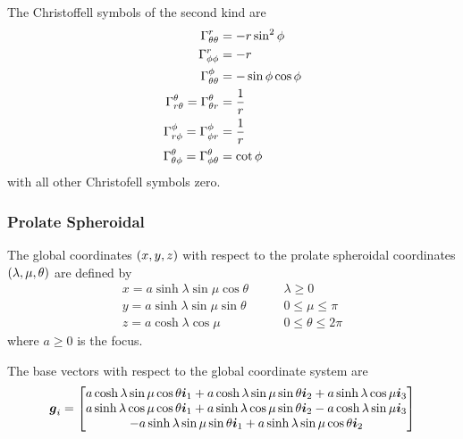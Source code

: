 The Christoffell symbols of the second kind are
\begin{align}
   \Gamma^{r}_{\theta\theta} &=-r\sin^{2}\phi \\
   \Gamma^{r}_{\phi\phi} &=-r \\
   \Gamma^{\phi}_{\theta\theta} &=-\sin\phi\cos\phi \\
   \Gamma^{\theta}_{r\theta} = \Gamma^{\theta}_{\theta r} &=\frac{1}{r} \\
   \Gamma^{\phi}_{r\phi} = \Gamma^{\phi}_{\phi r} &=\frac{1}{r} \\
   \Gamma^{\theta}_{\theta\phi} = \Gamma^{\theta}_{\phi\theta} &=\cot\phi
\end{align}
with all other Christofell symbols zero.

\subsubsection{Prolate Spheroidal}

The global coordinates $\left( x,y,z \right)$ with respect to the prolate spheroidal
coordinates $\left( \lambda,\mu,\theta \right)$ are defined by
\begin{equation}
  \begin{aligned}
    x = a\sinh\lambda\sin\mu\cos\theta & \qquad \lambda \ge 0 \\
    y = a\sinh\lambda\sin\mu\sin\theta & \qquad 0 \le \mu \le \pi \\
    z = a\cosh\lambda\cos\mu & \qquad 0 \le \theta \le 2\pi 
  \end{aligned}
\end{equation}
where $a\ge0$ is the focus.

The base vectors with respect to the global coordinate system are
\begin{equation}
  \boldsymbol{g}_{i}=\begin{bmatrix} 
    a\cosh\lambda\sin\mu\cos\theta\boldsymbol{i}_{1}+a\cosh\lambda\sin\mu\sin\theta\boldsymbol{i}_{2}+a\sinh\lambda\cos\mu\boldsymbol{i}_{3}\\ 
    a\sinh\lambda\cos\mu\cos\theta\boldsymbol{i}_{1}+a\sinh\lambda\cos\mu\sin\theta\boldsymbol{i}_{2}-a\cosh\lambda\sin\mu\boldsymbol{i}_{3}\\
    -a\sinh\lambda\sin\mu\sin\theta\boldsymbol{i}_{1}+a\sinh\lambda\sin\mu\cos\theta\boldsymbol{i}_{2}
  \end{bmatrix}
\end{equation}

